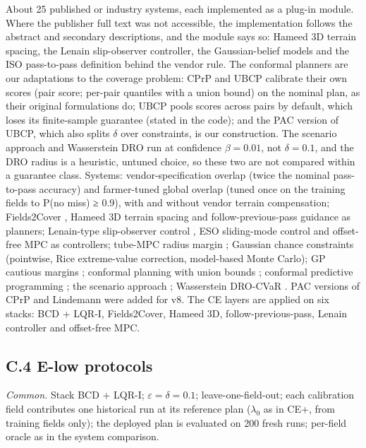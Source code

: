 \documentclass[preprint,12pt,authoryear]{elsarticle}
\begin{document}
About 25 published or industry systems, each implemented as a plug-in module. Where the publisher full text was not accessible, the implementation follows the abstract and secondary descriptions, and the module says so: Hameed 3D terrain spacing, the Lenain slip-observer controller, the Gaussian-belief models and the ISO pass-to-pass definition behind the vendor rule. The conformal planners are our adaptations to the coverage problem: CPrP and UBCP calibrate their own scores (pair score; per-pair quantiles with a union bound) on the nominal plan, as their original formulations do; UBCP pools scores across pairs by default, which loses its finite-sample guarantee (stated in the code); and the PAC version of UBCP, which also splits \(\delta\) over constraints, is our construction. The scenario approach and Wasserstein DRO run at confidence \(\beta=0.01\), not \(\delta=0.1\), and the DRO radius is a heuristic, untuned choice, so these two are not compared within a guarantee class. Systems: vendor-specification overlap (twice the nominal pass-to-pass accuracy) and farmer-tuned global overlap (tuned once on the training fields to P(no miss) ≥ 0.9), with and without vendor terrain compensation; Fields2Cover \citep{mier2023}, Hameed 3D terrain spacing \citep{hameed2016} and follow-previous-pass guidance as planners; Lenain-type slip-observer control \citep{lenain2006}, ESO sliding-mode control and offset-free MPC \citep{pannocchia2003} as controllers; tube-MPC radius margin \citep{mayne2005}; Gaussian chance constraints (pointwise, Rice extreme-value correction, model-based Monte Carlo); GP cautious margins \citep{hewing2020}; conformal planning with union bounds \citep{lindemann2023}; conformal predictive programming \citep[CPrP;][]{zhao2024}; the scenario approach \citep[PAC, \(\beta=0.01\);][]{campi2008}; Wasserstein DRO-CVaR \citep{mohajerin2018}. PAC versions of CPrP and Lindemann were added for v8. The CE layers are applied on six stacks: BCD + LQR-I, Fields2Cover, Hameed 3D, follow-previous-pass, Lenain controller and offset-free MPC.

\subsection*{C.4 E-low protocols}

\emph{Common.} Stack BCD + LQR-I; \(\varepsilon=\delta=0.1\); leave-one-field-out; each calibration field contributes one historical run at its reference plan (\(\lambda_0\) as in CE+, from training fields only); the deployed plan is evaluated on 200 fresh runs; per-field oracle as in the system comparison.
\end{document}
